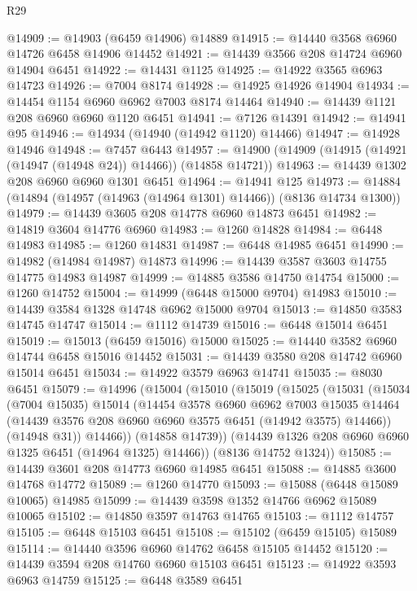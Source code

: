 \begin{lexlean}{R29}
\begin{coremodule}
@14909 := @14903 (@6459 @14906) @14889
@14915 := @14440 @3568 @6960 @14726 @6458 @14906 @14452
@14921 := @14439 @3566 @208 @14724 @6960 @14904 @6451
@14922 := @14431 @1125
@14925 := @14922 @3565 @6963 @14723
@14926 := @7004 @8174
@14928 := @14925 @14926 @14904
@14934 := @14454 @1154 @6960 @6962 @7003 @8174 @14464
@14940 := @14439 @1121 @208 @6960 @6960 @1120 @6451
@14941 := @7126 @14391
@14942 := @14941 @95
@14946 := @14934 (@14940 (@14942 @1120) @14466)
@14947 := @14928 @14946
@14948 := @7457 @6443
@14957 := @14900 (@14909 (@14915 (@14921 (@14947 (@14948 @24)) @14466)) (@14858 @14721))
@14963 := @14439 @1302 @208 @6960 @6960 @1301 @6451
@14964 := @14941 @125
@14973 := @14884 (@14894 (@14957 (@14963 (@14964 @1301) @14466)) (@8136 @14734 @1300))
@14979 := @14439 @3605 @208 @14778 @6960 @14873 @6451
@14982 := @14819 @3604 @14776 @6960
@14983 := @1260 @14828
@14984 := @6448 @14983
@14985 := @1260 @14831
@14987 := @6448 @14985 @6451
@14990 := @14982 (@14984 @14987) @14873
@14996 := @14439 @3587 @3603 @14755 @14775 @14983 @14987
@14999 := @14885 @3586 @14750 @14754
@15000 := @1260 @14752
@15004 := @14999 (@6448 @15000 @9704) @14983
@15010 := @14439 @3584 @1328 @14748 @6962 @15000 @9704
@15013 := @14850 @3583 @14745 @14747
@15014 := @1112 @14739
@15016 := @6448 @15014 @6451
@15019 := @15013 (@6459 @15016) @15000
@15025 := @14440 @3582 @6960 @14744 @6458 @15016 @14452
@15031 := @14439 @3580 @208 @14742 @6960 @15014 @6451
@15034 := @14922 @3579 @6963 @14741
@15035 := @8030 @6451
@15079 := @14996
    (@15004
      (@15010
        (@15019
          (@15025
            (@15031
              (@15034
                (@7004 @15035)
                @15014
                (@14454
                  @3578
                  @6960
                  @6962
                  @7003
                  @15035
                  @14464
                  (@14439 @3576 @208 @6960 @6960 @3575 @6451 (@14942 @3575) @14466))
                (@14948 @31))
              @14466))
          (@14858 @14739))
        (@14439 @1326 @208 @6960 @6960 @1325 @6451 (@14964 @1325) @14466))
      (@8136 @14752 @1324))
@15085 := @14439 @3601 @208 @14773 @6960 @14985 @6451
@15088 := @14885 @3600 @14768 @14772
@15089 := @1260 @14770
@15093 := @15088 (@6448 @15089 @10065) @14985
@15099 := @14439 @3598 @1352 @14766 @6962 @15089 @10065
@15102 := @14850 @3597 @14763 @14765
@15103 := @1112 @14757
@15105 := @6448 @15103 @6451
@15108 := @15102 (@6459 @15105) @15089
@15114 := @14440 @3596 @6960 @14762 @6458 @15105 @14452
@15120 := @14439 @3594 @208 @14760 @6960 @15103 @6451
@15123 := @14922 @3593 @6963 @14759
@15125 := @6448 @3589 @6451

\end{coremodule}
\end{lexlean}
